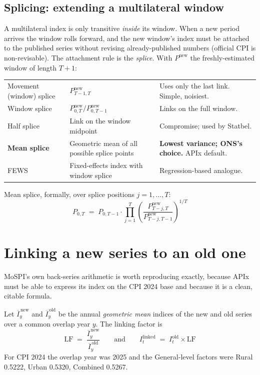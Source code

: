 \subsection{Splicing: extending a multilateral window}

A multilateral index is only transitive \emph{inside} its window. When a new period arrives
the window rolls forward, and the new window's index must be attached to the published
series without revising already-published numbers (official CPI is non-revisable). The
attachment rule is the \emph{splice}. With $P^{\text{new}}$ the freshly-estimated window of
length $T+1$:

\begin{center}
\small
\begin{tabularx}{\textwidth}{@{}L{3.0cm} L{5.6cm} X@{}}
\toprule
{} &  &  \\
\midrule
Movement (window) splice & $P^{\text{new}}_{T-1,T}$ & Uses only the last link. Simple, noisiest. \\
Window splice & $P^{\text{new}}_{0,T}/P^{\text{new}}_{0,T-1}$ & Links on the full window. \\
Half splice & Link on the window midpoint & Compromise; used by Statbel. \\
\textbf{Mean splice} & Geometric mean of all possible splice points & \textbf{Lowest variance; ONS's choice.} APIx default. \\
FEWS & Fixed-effects index with window splice & Regression-based analogue. \\
\bottomrule
\end{tabularx}
\end{center}

\noindent Mean splice, formally, over splice positions $j = 1,\dots,T$:
\begin{equation}
P_{0,T} \;=\; P_{0,T-1}\cdot\prod_{j=1}^{T}\left(\frac{P^{\text{new}}_{T-j,T}}{P^{\text{new}}_{T-j,T-1}}\right)^{1/T}
\end{equation}

\section{Linking a new series to an old one}

MoSPI's own back-series arithmetic is worth reproducing exactly, because APIx must be able
to express its index on the CPI 2024 base and because it is a clean, citable formula.

Let $\overline{I}^{\,\text{new}}_y$ and $\overline{I}^{\,\text{old}}_y$ be the annual
\emph{geometric mean} indices of the new and old series over a common overlap year $y$.
The linking factor is
\begin{equation}
\text{LF} \;=\; \frac{\overline{I}^{\,\text{new}}_y}{\overline{I}^{\,\text{old}}_y}
\qquad\text{and}\qquad
I^{\text{linked}}_t \;=\; I^{\text{old}}_t \times \text{LF}
\end{equation}
For CPI 2024 the overlap year was 2025 and the General-level factors were Rural 0.5222,
Urban 0.5320, Combined 0.5267.

